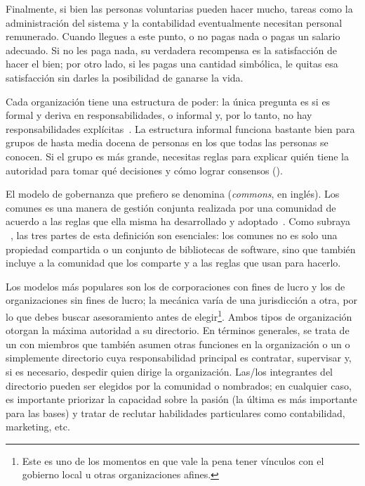Finalmente,
si bien  las personas voluntarias pueden hacer mucho,
tareas como la administración del sistema y la contabilidad eventualmente necesitan personal remunerado.
Cuando llegues a este punto, o no pagas nada o pagas un salario adecuado.
Si no les paga nada, su verdadera recompensa es la satisfacción de hacer el bien;
por otro lado, si les pagas una cantidad simbólica, le quitas esa satisfacción sin darles la posibilidad de ganarse la vida.


Cada organización tiene una estructura de poder:
la única pregunta es si es formal y deriva en responsabilidades, o informal y, por lo tanto, no hay responsabilidades explícitas~\cite{Free1972}.
La estructura informal funciona bastante bien para grupos de hasta media docena de personas
en los que todas las personas se conocen.
Si el grupo es más grande,
necesitas reglas para explicar
quién tiene la autoridad para tomar qué decisiones
y cómo lograr consensos ().

El modelo de gobernanza que prefiero se denomina  (\emph{commons}, en inglés). Los comunes es una manera de gestión conjunta realizada por una comunidad
de acuerdo a las reglas que ella misma ha desarrollado y adoptado~\cite{Ostr2015}.
Como subraya ~\cite{Boll2014}, las tres partes de esta definición son esenciales:
los comunes no es solo una propiedad compartida o un conjunto de bibliotecas de software,
sino que también incluye a la comunidad que los comparte y a las reglas que usan para hacerlo.

Los modelos más populares son los de corporaciones con fines de lucro y los de organizaciones sin fines de lucro;
la mecánica varía de una jurisdicción a otra,
por lo que debes buscar asesoramiento antes de elegir\footnote{
  Este es uno de los momentos
  en que vale la pena tener vínculos con el gobierno local u otras organizaciones afines.}.
Ambos tipos de organización otorgan la máxima autoridad a su directorio.
En términos generales, se trata de un 
con miembros que también asumen otras funciones en la organización
o un  o simplemente directorio cuya 
responsabilidad principal es contratar, supervisar
y, si es necesario, despedir quien dirige la organización.
Las/los integrantes del directorio pueden ser elegidos por la comunidad o nombrados;
en cualquier caso, es importante priorizar la capacidad sobre la pasión
(la última es más importante para las bases)
y tratar de reclutar habilidades particulares como contabilidad, marketing, etc.

